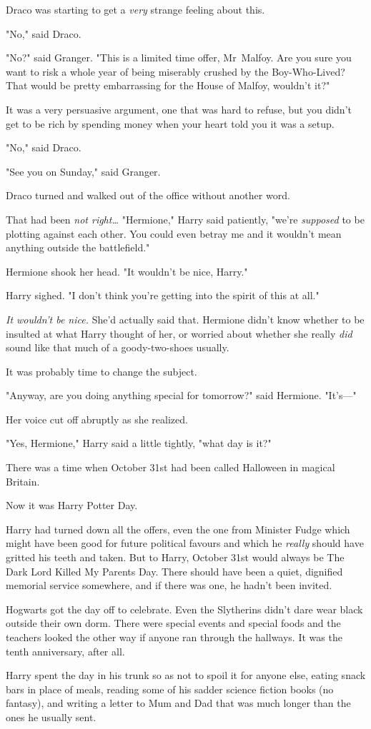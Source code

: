Draco was starting to get a \emph{very} strange feeling about this.

"No," said Draco.

"No?" said Granger. "This is a limited time offer, Mr~Malfoy. Are you sure you
want to risk a whole year of being miserably crushed by the Boy-Who-Lived? That
would be pretty embarrassing for the House of Malfoy, wouldn't it?"

It was a very persuasive argument, one that was hard to refuse, but you didn't
get to be rich by spending money when your heart told you it was a setup.

"No," said Draco.

"See you on Sunday," said Granger.

Draco turned and walked out of the office without another word.

That had been \emph{not right…}
\later
"Hermione," Harry said patiently, "we're \emph{supposed} to be plotting against
each other. You could even betray me and it wouldn't mean anything outside the
battlefield."

Hermione shook her head. "It wouldn't be nice, Harry."

Harry sighed. "I don't think you're getting into the spirit of this at all."

\emph{It wouldn't be nice.} She'd actually said that. Hermione didn't know
whether to be insulted at what Harry thought of her, or worried about whether
she really \emph{did} sound like that much of a goody-two-shoes usually.

It was probably time to change the subject.

"Anyway, are you doing anything special for tomorrow?" said Hermione. "It's---"

Her voice cut off abruptly as she realized.

"Yes, Hermione," Harry said a little tightly, "what day is it?"

There was a time when October 31st had been called Halloween in magical Britain.

Now it was Harry Potter Day.

Harry had turned down all the offers, even the one from Minister Fudge which
might have been good for future political favours and which he \emph{really}
should have gritted his teeth and taken. But to Harry, October 31st would
always be The Dark Lord Killed My Parents Day. There should have been a quiet,
dignified memorial service somewhere, and if there was one, he hadn't been
invited.

Hogwarts got the day off to celebrate. Even the Slytherins didn't dare wear
black outside their own dorm. There were special events and special foods and
the teachers looked the other way if anyone ran through the hallways. It was
the tenth anniversary, after all.

Harry spent the day in his trunk so as not to spoil it for anyone else, eating
snack bars in place of meals, reading some of his sadder science fiction books
(no fantasy), and writing a letter to Mum and Dad that was much longer than the
ones he usually sent.
